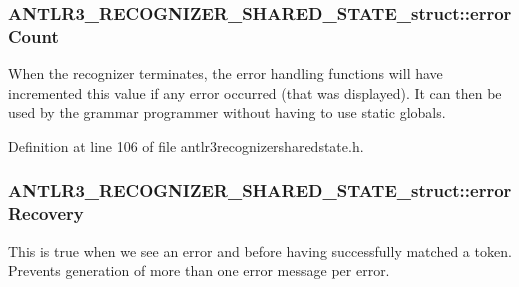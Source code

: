 \hypertarget{struct_a_n_t_l_r3___r_e_c_o_g_n_i_z_e_r___s_h_a_r_e_d___s_t_a_t_e__struct_a48e2a56da1203d94bafb1d0c61025313}{
\subsubsection[{error\-Count}]{ A\-N\-T\-L\-R3\-\_\-\-R\-E\-C\-O\-G\-N\-I\-Z\-E\-R\-\_\-\-S\-H\-A\-R\-E\-D\-\_\-\-S\-T\-A\-T\-E\-\_\-struct\-::error\-Count}}\label{struct_a_n_t_l_r3___r_e_c_o_g_n_i_z_e_r___s_h_a_r_e_d___s_t_a_t_e__struct_a48e2a56da1203d94bafb1d0c61025313}
When the recognizer terminates, the error handling functions will have incremented this value if any error occurred (that was displayed). It can then be used by the grammar programmer without having to use static globals. 

Definition at line 106 of file antlr3recognizersharedstate.\-h.

\hypertarget{struct_a_n_t_l_r3___r_e_c_o_g_n_i_z_e_r___s_h_a_r_e_d___s_t_a_t_e__struct_af6d6be2a1b8daf4d33665ad1287113f6}{
\subsubsection[{error\-Recovery}]{ A\-N\-T\-L\-R3\-\_\-\-R\-E\-C\-O\-G\-N\-I\-Z\-E\-R\-\_\-\-S\-H\-A\-R\-E\-D\-\_\-\-S\-T\-A\-T\-E\-\_\-struct\-::error\-Recovery}}\label{struct_a_n_t_l_r3___r_e_c_o_g_n_i_z_e_r___s_h_a_r_e_d___s_t_a_t_e__struct_af6d6be2a1b8daf4d33665ad1287113f6}
This is true when we see an error and before having successfully matched a token. Prevents generation of more than one error message per error. 

